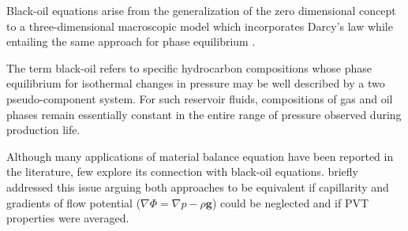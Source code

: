 \documentclass[authoryear,preprint,review,12pt]{elsarticle}
\begin{document}
Black-oil equations arise from the generalization of the zero dimensional concept to a three-dimensional macroscopic model which incorporates Darcy's law while entailing the same approach for phase equilibrium \citep{aziz1979petroleum}.

The term black-oil refers to specific hydrocarbon compositions whose phase equilibrium for isothermal changes in pressure may be well described by a two pseudo-component system. For such reservoir fluids, compositions of gas and oil phases remain essentially constant in the entire range of pressure observed during production life. 



Although many applications of material balance equation have been reported in the literature, few explore its connection with black-oil equations. \cite{ertekin2001basic} briefly addressed this issue arguing both approaches to be equivalent if capillarity and gradients of flow potential ($\nabla \Phi = \nabla p - \rho \mathbf{g}$) could be neglected and if PVT properties were averaged.



\end{document}
